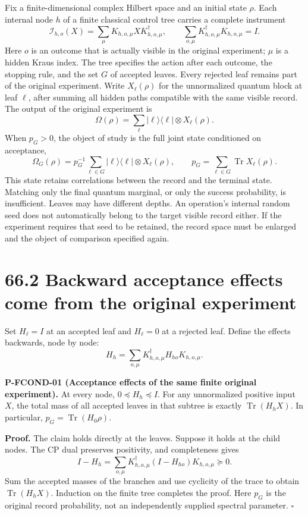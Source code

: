 \documentclass[
  11pt,
  oneside]{book}
\begin{document}
Fix a finite-dimensional complex Hilbert space and an initial state
\(\rho\). Each internal node \(h\) of a finite classical control tree
carries a complete instrument \[
\mathcal I_{h,o}(X)=\sum_\mu K_{h,o,\mu}XK_{h,o,\mu}^{\dagger},\qquad
\sum_{o,\mu}K_{h,o,\mu}^{\dagger}K_{h,o,\mu}=I.
\] Here \(o\) is an outcome that is actually visible in the original
experiment; \(\mu\) is a hidden Kraus index. The tree specifies the
action after each outcome, the stopping rule, and the set \(G\) of
accepted leaves. Every rejected leaf remains part of the original
experiment. Write \(X_\ell(\rho)\) for the unnormalized quantum block at
leaf \(\ell\), after summing all hidden paths compatible with the same
visible record. The output of the original experiment is \[
\Omega(\rho)=\sum_\ell |\ell\rangle\langle\ell|\otimes X_\ell(\rho).
\] When \(p_G>0\), the object of study is the full joint state
conditioned on acceptance, \[
\Omega_G(\rho)=p_G^{-1}\sum_{\ell\in G}
 |\ell\rangle\langle\ell|\otimes X_\ell(\rho),\qquad
p_G=\sum_{\ell\in G}\operatorname{Tr}X_\ell(\rho).
\] This state retains correlations between the record and the terminal
state. Matching only the final quantum marginal, or only the success
probability, is insufficient. Leaves may have different depths. An
operation's internal random seed does not automatically belong to the
target visible record either. If the experiment requires that seed to be
retained, the record space must be enlarged and the object of comparison
specified again.

\section{66.2 Backward acceptance effects come from the original
experiment}

Set \(H_\ell=I\) at an accepted leaf and \(H_\ell=0\) at a rejected
leaf. Define the effects backwards, node by node: \[
H_h=\sum_{o,\mu}K_{h,o,\mu}^{\dagger}H_{ho}K_{h,o,\mu}.
\]

\label{p-fcond-01}{} \textbf{P-FCOND-01 (Acceptance
effects of the same finite original experiment).} At every node,
\(0\preceq H_h\preceq I\). For any unnormalized positive input \(X\),
the total mass of all accepted leaves in that subtree is exactly
\(\operatorname{Tr}(H_hX)\). In particular,
\(p_G=\operatorname{Tr}(H_0\rho)\).

\textbf{Proof.} The claim holds directly at the leaves. Suppose it holds
at the child nodes. The CP dual preserves positivity, and completeness
gives \[
I-H_h=\sum_{o,\mu}K_{h,o,\mu}^{\dagger}(I-H_{ho})K_{h,o,\mu}\succeq0.
\] Sum the accepted masses of the branches and use cyclicity of the
trace to obtain \(\operatorname{Tr}(H_hX)\). Induction on the finite
tree completes the proof. Here \(p_G\) is the original record
probability, not an independently supplied spectral parameter.
\(\square\)
\end{document}
